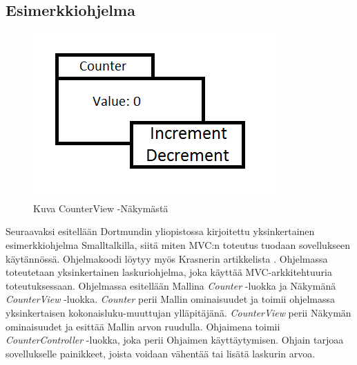 \documentclass[utf8]{gradu3}
\begin{document}
\subsection{Esimerkkiohjelma}
\begin{figure}[h]
\centering
\includegraphics[scale=0.85]{counter.png}
\caption{Kuva CounterView -Näkymästä \parencite{krasner_desc}}
\end{figure}

Seuraavaksi esitellään Dortmundin yliopistossa kirjoitettu yksinkertainen esimerkkiohjelma Smalltalkilla, siitä miten MVC:n toteutus tuodaan sovellukseen käytännössä. Ohjelmakoodi löytyy myös Krasnerin artikkelista \parencite[s. 20]{krasner_desc}. Ohjelmassa toteutetaan yksinkertainen laskuriohjelma, joka käyttää MVC-arkkitehtuuria toteutuksessaan. Ohjelmassa esitellään Mallina \emph{Counter} -luokka ja Näkymänä \emph{CounterView} -luokka. \emph{Counter} perii Mallin ominaisuudet ja
toimii ohjelmassa yksinkertaisen kokonaisluku-muuttujan ylläpitäjänä. \emph{CounterView} perii Näkymän ominaisuudet ja esittää Mallin arvon ruudulla.
Ohjaimena toimii \emph{CounterController} -luokka, joka perii Ohjaimen käyttäytymisen. Ohjain tarjoaa sovellukselle painikkeet, joista voidaan vähentää
tai lisätä laskurin arvoa.
\end{document}
